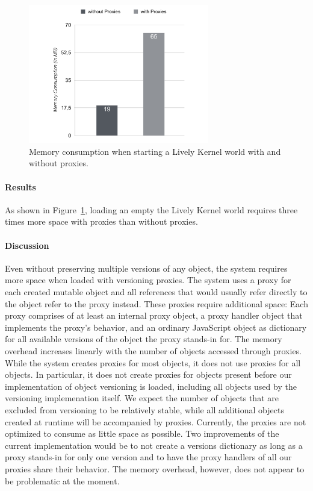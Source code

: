 \begin{figure}[h!]
    \centering
    \includegraphics[width=0.7\textwidth]{figures/6_evaluation/1_memoryOverhead.pdf}
    \caption{Memory consumption when starting a Lively Kernel world with and without proxies.}
    \label{fig:MemoryOverheadForReferences}
\end{figure}

\paragraph{Results}
As shown in Figure~\ref{fig:MemoryOverheadForReferences}, loading an empty the Lively Kernel world requires three times more space with proxies than without proxies.

\paragraph{Discussion}
Even without preserving multiple versions of any object, the system requires more space when loaded with versioning proxies.
The system uses a proxy for each created mutable object and all references that would usually refer directly to the object refer to the proxy instead.
These proxies require additional space: Each proxy comprises of at least an internal proxy object, a proxy handler object that implements the proxy's behavior, and an ordinary JavaScript object as dictionary for all available versions of the object the proxy stands-in for.
The memory overhead increases linearly with the number of objects accessed through proxies.
While the system creates proxies for most objects, it does not use proxies for all objects.
In particular, it does not create proxies for objects present before our implementation of object versioning is loaded, including all objects used by the versioning implemenation itself.
We expect the number of objects that are excluded from versioning to be relatively stable, while all additional objects created at runtime will be accompanied by proxies.
Currently, the proxies are not optimized to consume as little space as possible.
Two improvements of the current implementation would be to not create a versions dictionary as long as a proxy stands-in for only one version and to have the proxy handlers of all our proxies share their behavior.
The memory overhead, however, does not appear to be problematic at the moment.


